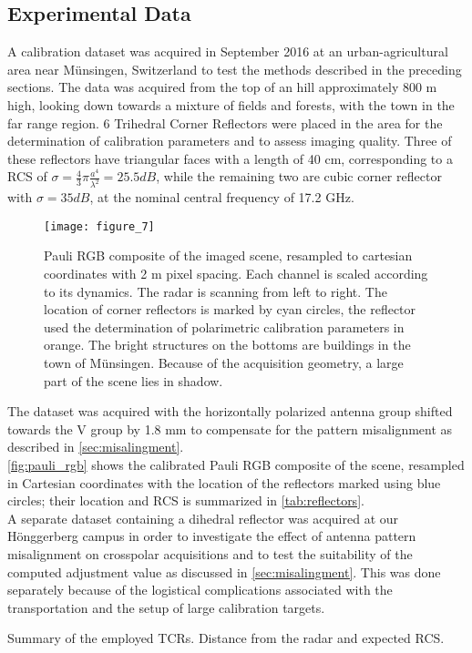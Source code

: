 \subsection{Experimental Data}\label{sec:data}
A calibration dataset was acquired in September 2016 at an urban-agricultural area near M\"{u}nsingen, Switzerland to test the methods described in the preceding sections. The data was acquired from the top of an hill approximately 800 m high, looking down towards a mixture of fields and forests, with the town in the far range region. 6 Trihedral Corner Reflectors were placed in the area for the determination of calibration parameters and to assess imaging quality. Three of these reflectors have triangular faces with a length of 40 cm, corresponding to a RCS of $\sigma=\frac{4}{3}\pi \frac{a^4}{\lambda^2}=25.5 dB$, while the remaining two are cubic corner reflector with $\sigma= 35 dB$, at the nominal central frequency of 17.2 GHz.
	\begin{figure*}
		\centering
		\texttt{[image: figure\_7]}
		\caption{Pauli RGB composite of the imaged scene, resampled to cartesian coordinates with 2 m pixel spacing. Each channel is scaled according to its dynamics. The radar is scanning from left to right. The location of corner reflectors is marked by cyan circles, the reflector used the determination of polarimetric calibration parameters in orange. The bright structures on the bottoms are buildings in the town of M\"{u}nsingen. Because of the acquisition geometry, a large part of the scene lies in shadow.}
		\label{fig:pauli_rgb}
	\end{figure*}
The dataset was acquired with the horizontally polarized antenna group shifted towards the V group by 1.8 mm to compensate for the pattern misalignment as described in \autoref{sec:misalingment}.\\
\autoref{fig:pauli_rgb} shows the calibrated Pauli RGB composite of the scene, resampled in Cartesian coordinates with the location of the reflectors marked using blue circles; their location and RCS is summarized in \autoref{tab:reflectors}.\\
A separate dataset containing a dihedral reflector was acquired at our H\"{o}nggerberg campus in order to investigate the effect of antenna pattern misalignment on crosspolar acquisitions and to test the suitability of the computed adjustment value as discussed in \autoref{sec:misalingment}. This was done separately because of the logistical complications associated with the transportation and the setup of large calibration targets.

\begin{table}[ht]
	\centering
	\caption{Summary of the employed TCRs. Distance from the radar and expected RCS.}
	\label{tab:reflectors}
\end{table}



